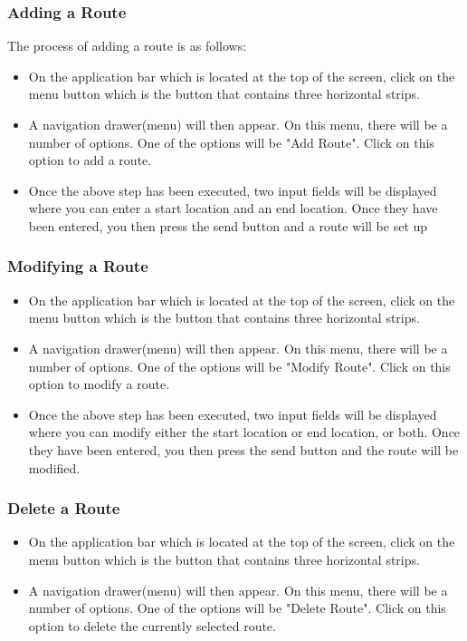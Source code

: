 \documentclass[a4paper,12pt]{article}
\begin{document}
\subsubsection{Adding a Route}
The process of adding a route is as follows:
\begin{itemize}
    \item On the application bar which is located at the top of the screen, click on the menu button which is the button that contains three horizontal strips.
    \item A navigation drawer(menu) will then appear. On this menu, there will be a number of options. One of the options will be "Add Route". Click on this option to add a route.
    \item Once the above step has been executed, two input fields will be displayed  where you can enter a start location and an end location. Once they have been entered, you then press the send button and a route will be set up
\end{itemize}
\subsubsection{Modifying a Route}
\begin{itemize}
    \item On the application bar which is located at the top of the screen, click on the menu button which is the button that contains three horizontal strips.
    \item A navigation drawer(menu) will then appear. On this menu, there will be a number of options. One of the options will be "Modify Route". Click on this option to modify a route.
    \item Once the above step has been executed, two input fields will be displayed  where you can modify either the start location or end location, or both. Once they have been entered, you then press the send button and the route will be modified.
\end{itemize}
\subsubsection{Delete a Route}
\begin{itemize}
    \item On the application bar which is located at the top of the screen, click on the menu button which is the button that contains three horizontal strips.
    \item A navigation drawer(menu) will then appear. On this menu, there will be a number of options. One of the options will be "Delete Route". Click on this option to delete the currently selected route.
\end{itemize}
\end{document}
